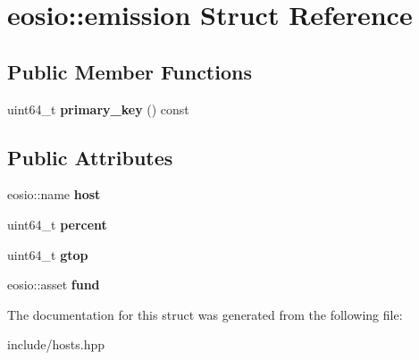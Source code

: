 \hypertarget{structeosio_1_1emission}{}\section{eosio\+:\+:emission Struct Reference}
\label{structeosio_1_1emission}
\subsection*{Public Member Functions}
\begin{DoxyCompactItemize}
\item 
\mbox{\label{structeosio_1_1emission_a2f2cc1084ef450e7c6f9e7c2872e44aa}} 
uint64\+\_\+t {\bfseries primary\+\_\+key} () const
\end{DoxyCompactItemize}
\subsection*{Public Attributes}
\begin{DoxyCompactItemize}
\item 
\mbox{\label{structeosio_1_1emission_ad7a051f9a202d542ab40ad74f8bba9c7}} 
eosio\+::name {\bfseries host}
\item 
\mbox{\label{structeosio_1_1emission_a4c3909f20d8d43efd6d76cfb37417512}} 
uint64\+\_\+t {\bfseries percent}
\item 
\mbox{\label{structeosio_1_1emission_ae933ccdc18987fe001c920abcd8746ac}} 
uint64\+\_\+t {\bfseries gtop}
\item 
\mbox{\label{structeosio_1_1emission_a04515ebf5f0ac9cbb2840fe681387528}} 
eosio\+::asset {\bfseries fund}
\end{DoxyCompactItemize}


The documentation for this struct was generated from the following file\+:\begin{DoxyCompactItemize}
\item 
include/hosts.\+hpp\end{DoxyCompactItemize}

